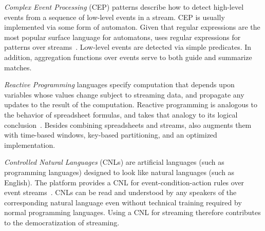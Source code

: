 \emph{Complex Event Processing} (CEP) patterns describe how to detect
high-level events from a sequence of low-level events in a
stream. CEP is usually implemented via some form of automaton. Given
that regular expressions are the most popular surface language for
automatons,  uses regular expressions for patterns over
streams~\cite{hirzel_2012}. Low-level events are detected via simple
predicates. In addition, aggregation functions over events serve to
both guide and summarize matches.

\emph{Reactive Programming} languages specify computation that depends
upon variables whose values change subject to streaming data, and
propagate any updates to the result of the computation. Reactive
programming is analogous to the behavior of spreadsheet formulas, and
 takes that analogy to its logical
conclusion~\cite{hirzel_et_al_2016}. Besides combining spreadsheets
and streams,  also augments them with time-based windows,
key-based partitioning, and an optimized implementation.

\emph{Controlled Natural Languages} (CNLs) are artificial languages
(such as programming languages) designed to look like natural
languages (such as English).  The  platform provides a CNL for
event-condition-action rules over event
streams~\cite{arnold_et_al_2016}. CNLs can be read and understood by
any speakers of the corresponding natural language even without
technical training required by normal programming languages. Using a
CNL for streaming therefore contributes to the democratization of
streaming.

\iffalse
Overall, the field of stream processing languages is diverse.  On the
formal side, Soul\'{e} et al.\ show how to unify three streaming languages
on a common core calculus~\cite{soule_et_al_2016}. Practical efforts
to consolidate and standardize should be informed by an overview of
the state of the art, which this tutorial provided.
\fi
